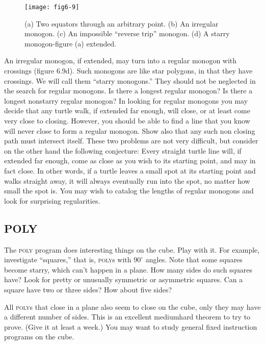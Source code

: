 \documentclass{book}
\begin{document}
\begin{figure}
\begin{center}
\texttt{[image: fig6-9]}
\caption{(a) Two equators through an arbitrary point. (b) An irregular monogon. (c) An impossible ``reverse trip'' monogon. (d) A starry monogon-figure (a) extended.}
\end{center}
\end{figure}

An irregular monogon, if extended, may turn into a regular monogon
with crossings (figure 6.9d). Such monogons are like star polygons, in
that they have crossings. We will call them ``starry monogons.'' They
should not be neglected in the search for regular monogons. Is there a
longest regular monogon? Is there a longest nonstarry regular monogon?
In looking for regular monogons you may decide that any turtle walk,
if extended far enough, will close, or at least come very close to closing.
However, you should be able to find a line that you know will never
close to form a regular monogon. Show also that any such non closing
path must intersect itself. These two problems are not very difficult,
but consider on the other hand the following conjecture: Every straight
turtle line will, if extended far enough, come as close as you wish to its
starting point, and may in fact close. In other words, if a turtle leaves
a small spot at its starting point and walks straight away, it will always
eventually run into the spot, no matter how small the spot is.
You may wish to catalog the lengths of regular monogons and look
for surprising regularities.

\subsection{POLY}

The \textsc{poly} program does interesting things on the cube. Play with it. For
example, investigate ``squares,'' that is, \textsc{poly}s with $90^{\circ}$ angles. Note that
some squares become starry, which can't happen in a plane. How many
sides do such squares have? Look for pretty or unusually symmetric or
asymmetric squares. Can a square have two or three sides? How about
five sides?

All \textsc{poly}s that close in a plane also seem to close on the cube, only
they may have a different number of sides. This is an excellent mediumhard theorem to try to prove. (Give it at least a week.) You may want
to study general fixed instruction programs on the cube.
\end{document}
